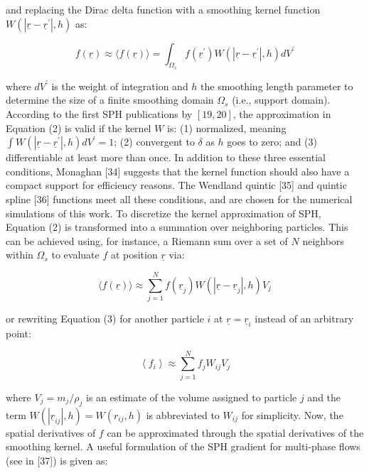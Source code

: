 \documentclass[10pt]{article}
\begin{document}
and replacing the Dirac delta function with a smoothing kernel function $W\left(\left|\underline{r}-\underline{r}^{\prime}\right|, h\right)$ as:


\begin{equation*}
f(\underline{r}) \approx\langle f(\underline{r})\rangle=\int_{\Omega_{s}} f\left(\underline{r}^{\prime}\right) W\left(\left|\underline{r}-\underline{r}^{\prime}\right|, h\right) d V^{\prime} \tag{2}
\end{equation*}


where $d V^{\prime}$ is the weight of integration and $h$ the smoothing length parameter to determine the size of a finite smoothing domain $\Omega_{s}$ (i.e., support domain). According to the first SPH publications by $[19,20]$, the approximation in Equation (2) is valid if the kernel $W$ is: (1) normalized, meaning $\int W\left(\left|\underline{r}-\underline{r}^{\prime}\right|, h\right) d V^{\prime}=1$; (2) convergent to $\delta$ as $h$ goes to zero; and (3) differentiable at least more than once. In addition to these three essential conditions, Monaghan [34] suggests that the kernel function should also have a compact support for efficiency reasons. The Wendland quintic [35] and quintic spline [36] functions meet all these conditions, and are chosen for the numerical simulations of this work. To discretize the kernel approximation of SPH, Equation (2) is transformed into a summation over neighboring particles. This can be achieved using, for instance, a Riemann sum over a set of $N$ neighbors within $\Omega_{s}$ to evaluate $f$ at position $\underline{r}$ via:


\begin{equation*}
\langle f(\underline{r})\rangle \approx \sum_{j=1}^{N} f\left(\underline{r}_{j}\right) W\left(\left|\underline{r}-\underline{r}_{j}\right|, h\right) V_{j} \tag{3}
\end{equation*}


or rewriting Equation (3) for another particle $i$ at $\underline{r}=\underline{r}_{i}$ instead of an arbitrary point:


\begin{equation*}
\left\langle f_{i}\right\rangle \approx \sum_{j=1}^{N} f_{j} W_{i j} V_{j} \tag{4}
\end{equation*}


where $V_{j}=m_{j} / \rho_{j}$ is an estimate of the volume assigned to particle $j$ and the term $W\left(\left|\underline{r}_{i j}\right|, h\right)=W\left(r_{i j}, h\right)$ is abbreviated to $W_{i j}$ for simplicity. Now, the spatial derivatives of $f$ can be approximated through the spatial derivatives of the smoothing kernel. A useful formulation of the SPH gradient for multi-phase flows (see in [37]) is given as:
\end{document}
